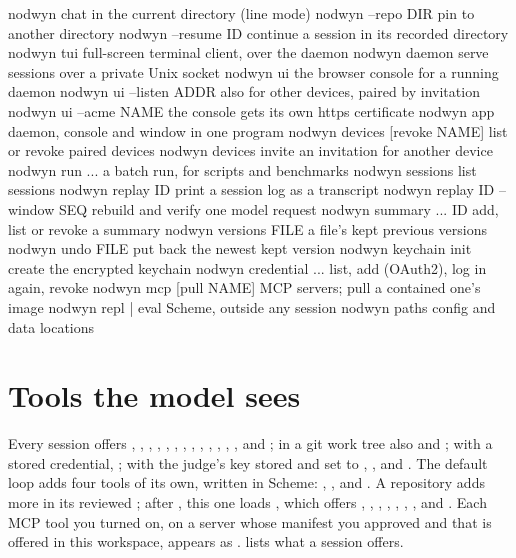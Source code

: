 \begin{txt}
nodwyn                        chat in the current directory (line mode)
nodwyn --repo DIR             pin to another directory
nodwyn --resume ID            continue a session in its recorded directory
nodwyn tui                    full-screen terminal client, over the daemon
nodwyn daemon                 serve sessions over a private Unix socket
nodwyn ui                     the browser console for a running daemon
nodwyn ui --listen ADDR       also for other devices, paired by invitation
nodwyn ui --acme NAME          the console gets its own https certificate
nodwyn app                    daemon, console and window in one program
nodwyn devices [revoke NAME]  list or revoke paired devices
nodwyn devices invite         an invitation for another device
nodwyn run ...                a batch run, for scripts and benchmarks
nodwyn sessions               list sessions
nodwyn replay ID              print a session log as a transcript
nodwyn replay ID --window SEQ rebuild and verify one model request
nodwyn summary ... ID         add, list or revoke a summary
nodwyn versions FILE          a file's kept previous versions
nodwyn undo FILE              put back the newest kept version
nodwyn keychain init          create the encrypted keychain
nodwyn credential ...         list, add (OAuth2), log in again, revoke
nodwyn mcp [pull NAME]        MCP servers; pull a contained one's image
nodwyn repl | eval            Scheme, outside any session
nodwyn paths                  config and data locations
\end{txt}

\section{Tools the model sees}

Every session offers , , ,
, , , ,
, , ,
, , ,
 and ; in a git work tree also
 and ; with a stored 
credential, ; with the judge's key stored and
 set to , ,  and
. The default loop adds four tools of its own, written
in Scheme: , , 
and . A repository adds
more in its reviewed ; after , this
one loads , which offers
, , , ,
, , ,  and
. Each MCP tool you turned on, on a server whose manifest you
approved and that is offered in this workspace, appears as
.  lists what a session offers.

